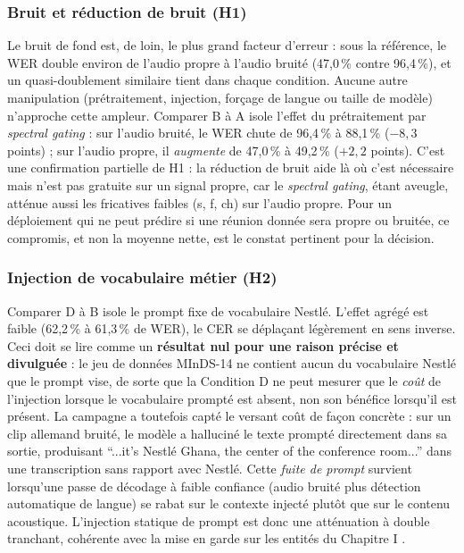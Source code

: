 \documentclass[12pt]{report}
\begin{document}
\subsubsection{Bruit et réduction de bruit (H1)}
Le bruit de fond est, de loin, le plus grand facteur d'erreur : sous la référence, le WER double environ de l'audio propre à l'audio bruité (47,0\,\% contre 96,4\,\%), et un quasi-doublement similaire tient dans chaque condition. Aucune autre manipulation (prétraitement, injection, forçage de langue ou taille de modèle) n'approche cette ampleur. Comparer B à A isole l'effet du prétraitement par \textit{spectral gating} : sur l'audio bruité, le WER chute de 96,4\,\% à 88,1\,\% ($-8{,}3$ points) ; sur l'audio propre, il \emph{augmente} de 47,0\,\% à 49,2\,\% ($+2{,}2$ points). C'est une confirmation partielle de H1 : la réduction de bruit aide là où c'est nécessaire mais n'est pas gratuite sur un signal propre, car le \textit{spectral gating}, étant aveugle, atténue aussi les fricatives faibles (s, f, ch) sur l'audio propre. Pour un déploiement qui ne peut prédire si une réunion donnée sera propre ou bruitée, ce compromis, et non la moyenne nette, est le constat pertinent pour la décision.
\subsubsection{Injection de vocabulaire métier (H2)}
Comparer D à B isole le prompt fixe de vocabulaire Nestl\'e. L'effet agrégé est faible (62,2\,\% à 61,3\,\% de WER), le CER se déplaçant légèrement en sens inverse. Ceci doit se lire comme un \textbf{résultat nul pour une raison précise et divulguée} : le jeu de données MInDS-14 ne contient aucun du vocabulaire Nestl\'e que le prompt vise, de sorte que la Condition D ne peut mesurer que le \emph{coût} de l'injection lorsque le vocabulaire prompté est absent, non son bénéfice lorsqu'il est présent. La campagne a toutefois capté le versant coût de façon concrète : sur un clip allemand bruité, le modèle a halluciné le texte prompté directement dans sa sortie, produisant \enquote{...it's Nestl\'e Ghana, the center of the conference room...} dans une transcription sans rapport avec Nestl\'e. Cette \emph{fuite de prompt} survient lorsqu'une passe de décodage à faible confiance (audio bruité plus détection automatique de langue) se rabat sur le contexte injecté plutôt que sur le contenu acoustique. L'injection statique de prompt est donc une atténuation à double tranchant, cohérente avec la mise en garde sur les entités du Chapitre I \cite{durmus2026contextual}.
\end{document}

